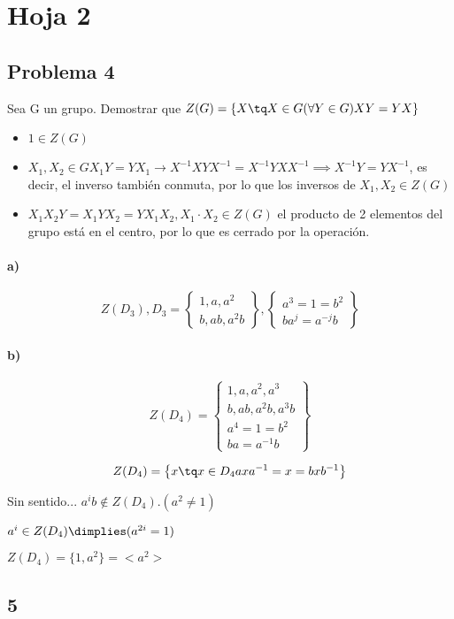 \documentclass{apuntes}
\begin{document}
\section{Hoja 2}
\subsection{Problema 4}
Sea G un grupo. Demostrar que $Z(G) = \{X \tq X\in G (\forall Y \in G) XY = YX\}$

\begin{itemize}
\item $1 \in Z(G)$
\item {$X_1,X_2 \in G X_1Y = YX_1 \rightarrow X^{-1}XYX^{-1} = X^{-1}YXX^{-1} \implies X^{-1}Y=YX^{-1}$, es decir, el inverso también conmuta, por lo que los inversos de $X_1,X_2 \in Z(G)$}
\item {$X_1 X_2 Y = X_1 Y X_2 = YX_1 X_2, X_1 \cdot X_2 \in Z(G)$ el producto de 2 elementos del grupo está en el centro, por lo que es cerrado por la operación.}
\end{itemize}
\paragraph{a)}
$$Z(D_3), D_3 = \left\{\begin{matrix} 1,a,a^2\\b,ab,a^2b\end{matrix}\right\},\left\{\begin{matrix}a^3 = 1 = b^2\\ ba^j = a^{-j}b\end{matrix}\right\}$$

\paragraph{b)}
$$Z(D_4) =\left\{\begin{matrix} 1,a,a^2,a^3\\b,ab,a^2b,a^3b\\a^4=1=b^2\\ba=a^{-1}b\end{matrix}\right\}$$

$$Z(D_4) = \left\{x \tq x\in D_4 axa^{-1} = x = bxb^{-1}\right\}$$

Sin sentido...
$a^ib \notin Z(D_4). (a^2 \neq 1)$

$a^i \in Z(D_4) \dimplies (a^{2i} = 1)$

$Z(D_4) = \{1,a^2\} = <a^2>$
\subsection{5}
\end{document}
